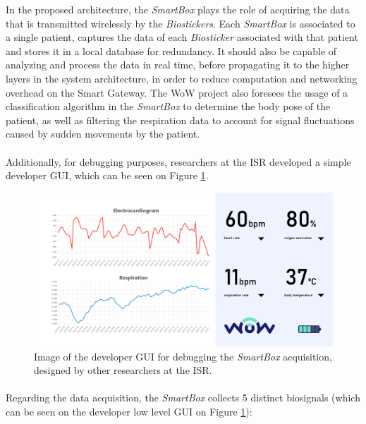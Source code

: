 
In the proposed architecture, the \textit{SmartBox} plays the role of acquiring the data that is transmitted wirelessly by the \textit{Biostickers}.
Each \textit{SmartBox} is associated to a single patient, captures the data of each \textit{Biosticker} associated with that patient and stores it in a local database for redundancy. 
It should also be capable of analyzing and process the data in real time, before propagating it to the higher layers in the system architecture, in order to reduce computation and networking overhead on the Smart Gateway. The \acs{WoW} project also foresees the usage of a classification algorithm in the \textit{SmartBox} to determine the body pose of the patient, as well as filtering the respiration data to account for signal fluctuations caused by sudden movements by the patient.  


\paragraph{}Additionally, for debugging purposes, researchers at the \acs{ISR} developed a simple developer \acs{GUI}, which can be seen on Figure \ref{fig:smartbox-gui}.

\begin{figure}[H]
    \centering
    \includegraphics[width=\linewidth]{images/smartbox-gui.png}
    \caption{Image of the developer \acf{GUI} for debugging the \textit{SmartBox} acquisition, designed by other researchers at the \acs{ISR}.}
    \label{fig:smartbox-gui}
\end{figure}

\paragraph{} Regarding the data acquisition, the \textit{SmartBox} collects 5 distinct biosignals (which can be seen on the developer low level \acs{GUI} on Figure \ref{fig:smartbox-gui}):

